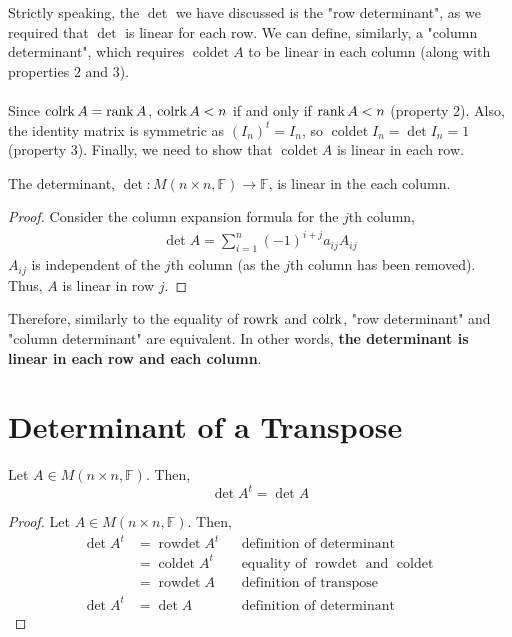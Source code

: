 \documentclass[letterpaper,12pt]{article}
\begin{document}
Strictly speaking, the $\det$ we have discussed is the "row determinant", as we required that $\det$ is linear for each row. We can define, similarly, a "column determinant", which requires $\operatorname{coldet}{A}$ to be linear in each column (along with properties $2$ and $3$).
\\ \\ Since $\operatorname{colrk}{A} = \operatorname{rank}{A}$, $\operatorname{colrk}{A} < n$ if and only if $\operatorname{rank}{A} < n$ (property 2). Also, the identity matrix is symmetric as $(I_n)^t = I_n$, so $\operatorname{coldet}{I_n} = \det{I_n} = 1$ (property 3). Finally, we need to show that $\operatorname{coldet}{A}$ is linear in each row.

\begin{theorem}
The determinant, $\det: M(n \times n, \mathbb{F}) \rightarrow \mathbb{F}$, is linear in the each column.
\end{theorem}
\begin{proof}
Consider the column expansion formula for the $j$th column,
\begin{align*}
    \det{A} = \sum_{i=1}^n (-1)^{i+j} a_{ij} A_{ij}
\end{align*}
$A_{ij}$ is independent of the $j$th column (as the $j$th column has been removed). Thus, $A$ is linear in row $j$.
\end{proof}

Therefore, similarly to the equality of $\operatorname{rowrk}$ and $\operatorname{colrk}$, "row determinant" and "column determinant" are equivalent. In other words, \textbf{the determinant is linear in each row and each column}.

\section*{Determinant of a Transpose}
\begin{theorem}
Let $A \in M(n \times n, \mathbb{F})$. Then,
\begin{equation*}
    \boxed{\det{A^t} = \det{A}}
\end{equation*}
\end{theorem}
\begin{proof}
Let $A \in M(n \times n, \mathbb{F})$. Then,
\begin{align*}
    \det{A^t} & = \operatorname{rowdet}{A^t} && \text{definition of determinant} \\
    & = \operatorname{coldet}{A^t} && \text{equality of $\operatorname{rowdet}$ and $\operatorname{coldet}$} \\
    & = \operatorname{rowdet}{A} && \text{definition of transpose} \\
    \det{A^t} & = \det{A} && \text{definition of determinant}
\end{align*}
\end{proof}
\end{document}

